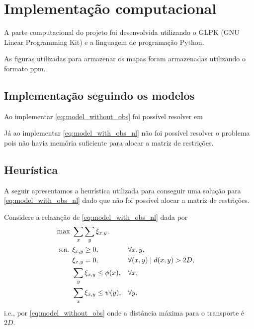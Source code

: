 %
%
%

\section{Implementa\c{c}\~{a}o computacional}
A parte computacional do projeto foi desenvolvida utilizando o GLPK (GNU Linear
Programming Kit)\nocite{GLPK} e a linguagem de programação Python\nocite{Python}.

As figuras utilizadas para armazenar os mapas foram armazenadas
utilizando o formato ppm.

\subsection{Implementação seguindo os modelos}
Ao implementar \eqref{eq:model_without_obs} foi possível resolver em

Já ao implementar \eqref{eq:model_with_obs_nl} não foi possível resolver o
problema pois não havia memória suficiente para alocar a matriz de restrições.

\subsection{Heurística}
A seguir apresentamos a heurística utilizada para conseguir uma solução para
\eqref{eq:model_with_obs_nl} dado que não foi possível alocar a matriz de
restrições.

Considere a relaxação de \eqref{eq:model_with_obs_nl} dada por
\begin{align}
    \text{max } & \sum_{x} \sum_{y} \xi_{x, y}, \notag \\
    \text{s.a. } & \xi_{x, y} \geq 0, && \forall x, y, \notag \\
    & \xi_{x, y} = 0, && \forall (x, y) \mid d(x, y) > 2D,
    \label{eq:model_rel} \\
    & \sum_{y} \xi_{x, y} \leq \phi(x), && \forall x, \notag \\
    & \sum_{x} \xi_{x, y} \leq \psi(y), && \forall y, \notag
\end{align}
i.e., por \eqref{eq:model_without_obs} onde a distância máxima para o transporte
é $2D$.

